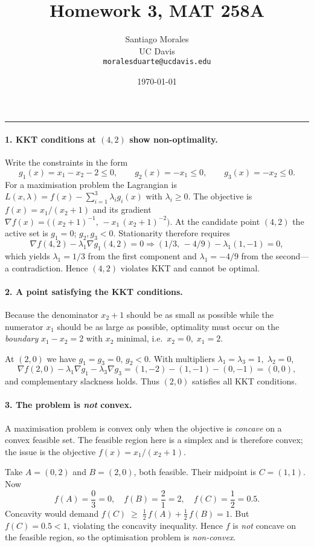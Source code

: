 \documentclass[11pt]{article}
\title{\vspace{-1cm} \textbf{Homework 3, MAT 258A}}
\author{Santiago Morales \\ UC Davis \\ \texttt{moralesduarte@ucdavis.edu}}
\date{\today}
\begin{document}
\maketitle
\vspace{-1em}
\hrule
\vspace{1em}

\paragraph{1.  KKT conditions at $(4,2)$ show non-optimality.}
Write the constraints in the form
\[
g_1(x)=x_1-x_2-2\le 0,\qquad
g_2(x)=-x_1\le 0,\qquad
g_3(x)=-x_2\le 0 .
\]
For a maximisation problem the Lagrangian is
\(L(x,\lambda)=f(x)-\sum_{i=1}^3\lambda_i g_i(x)\)
with $\lambda_i\ge 0$.  
The objective is
\(f(x)=x_1/(x_2+1)\) and its gradient
\(
\nabla f(x)=\bigl((x_2+1)^{-1},\,-x_1\,(x_2+1)^{-2}\bigr).
\)
At the candidate point $(4,2)$ the active set is
$g_1=0$; $g_2,g_3<0$.  
Stationarity therefore requires
\[
\nabla f(4,2)-\lambda_1\nabla g_1(4,2)=0
\Longrightarrow
(1/3,\,-4/9)-\lambda_1(1,-1)=0,
\]
which yields \(\lambda_1=1/3\) from the first component and 
\(\lambda_1=-4/9\) from the second—a contradiction.  
Hence $(4,2)$ violates KKT and cannot be optimal.

\paragraph{2.  A point satisfying the KKT conditions.}
Because the denominator $x_2+1$ should be as small as possible
while the numerator $x_1$ should be as large as possible, optimality
must occur on the \emph{boundary} $x_1-x_2=2$ with $x_2$ minimal,
i.e.\ $x_2=0,\;x_1=2$.

At $(2,0)$ we have $g_1=g_3=0,\,g_2<0$.  
With multipliers $\lambda_1=\lambda_3=1,\;\lambda_2=0$,
\[
\nabla f(2,0)-\lambda_1\nabla g_1-\lambda_3\nabla g_3
=(1,-2)-(1,-1)-(0,-1)=(0,0),
\]
and complementary slackness holds.
Thus $(2,0)$ satisfies all KKT conditions.

\paragraph{3.  The problem is \emph{not} convex.}
A maximisation problem is convex only when the objective is \emph{concave} on a
convex feasible set.  The feasible region here is a simplex and is therefore
convex; the issue is the objective 
\(f(x)=x_{1}/(x_{2}+1)\).

Take 
\(A=(0,2)\)  and  \(B=(2,0)\),
both feasible.
Their midpoint is
\(C=(1,1)\).
Now
\[
f(A)=\frac{0}{3}=0,\quad
f(B)=\frac{2}{1}=2,\quad
f(C)=\frac{1}{2}=0.5 .
\]
Concavity would demand
\(
f(C) \;\ge\; \tfrac12\,f(A)+\tfrac12\,f(B) = 1.
\)
But \(f(C)=0.5<1\), violating the concavity inequality.
Hence \(f\) is \emph{not} concave on the feasible region,
so the optimisation problem is \emph{non-convex}. 
\end{document}

